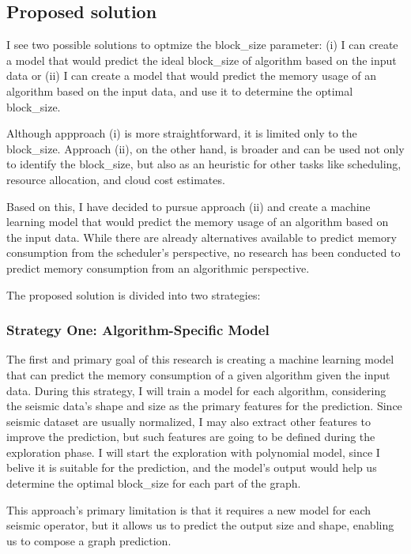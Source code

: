 \subsection{Proposed solution}
\label{subsec:proposed-solution}

I see two possible solutions to optmize the block\_size parameter:
(i) I can create a model that would predict the ideal block\_size of algorithm based on the input data or
(ii) I can create a model that would predict the memory usage of an algorithm based on the input data, and use it to determine the optimal block\_size.

Although appproach (i) is more straightforward, it is limited only to the block\_size.
Approach (ii), on the other hand, is broader and can be used not only to identify the block\_size, but also as an heuristic for other tasks like scheduling, resource allocation, and cloud cost estimates.

Based on this, I have decided to pursue approach (ii) and create a machine learning model that would predict the memory usage of an algorithm based on the input data. 
While there are already alternatives available to predict memory consumption from the scheduler's perspective, no research has been conducted to predict memory consumption from an algorithmic perspective.

The proposed solution is divided into two strategies:

\subsubsection{Strategy One: Algorithm-Specific Model}
\label{subsubsec:algorithm-specific-model}

The first and primary goal of this research is creating a machine learning model that can predict the memory consumption of a given algorithm given the input data.
During this strategy, I will train a model for each algorithm, considering the seismic data's shape and size as the primary features for the prediction.
Since seismic dataset are usually normalized, I may also extract other features to improve the prediction, but such features are going to be defined during the exploration phase.
I will start the exploration with polynomial model, since I belive it is suitable for the prediction, and the model's output would help us determine the optimal block\_size for each part of the graph.

This approach's primary limitation is that it requires a new model for each seismic operator, but it allows us to predict the output size and shape, enabling us to compose a graph prediction.


